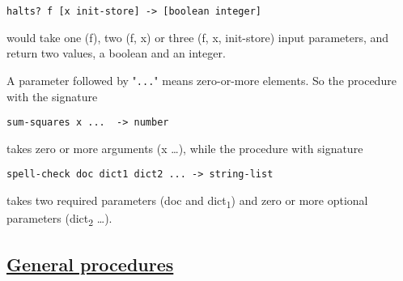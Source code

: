 \begin{verbatim}
halts? f [x init-store] -> [boolean integer]
\end{verbatim}

would take one (f), two (f, x) or three (f, x, init-store) input
parameters, and return two values, a boolean and an integer.

A parameter followed by "\texttt{...}" means zero-or-more elements. So
the procedure with the signature

\begin{verbatim}
sum-squares x ...  -> number
\end{verbatim}

takes zero or more arguments (x \ldots{}), while the procedure with
signature

\begin{verbatim}
spell-check doc dict1 dict2 ... -> string-list
\end{verbatim}

takes two required parameters (doc and dict\textsubscript{1}) and zero
or more optional parameters (dict\textsubscript{2} \ldots{}).

\subsection{\texorpdfstring{\href{}{General
procedures}}{General procedures}}\label{general-procedures}

